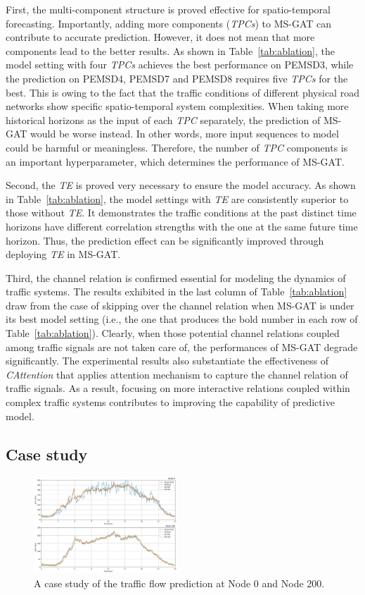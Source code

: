 First, the multi-component structure is proved effective for spatio-temporal forecasting. Importantly, adding more components (\textit{TPCs})  to MS-GAT can contribute to accurate prediction. However, it does not mean that more components lead to the better results. As shown in Table~\ref{tab:ablation}, the model setting with four \textit{TPCs} achieves the best performance on PEMSD3, while the prediction on PEMSD4, PEMSD7 and PEMSD8 requires five \textit{TPCs} for the best. This is owing to the fact that the traffic conditions of different physical road networks show specific spatio-temporal system complexities. When taking more historical horizons as the input of each \textit{TPC} separately, the prediction of MS-GAT would be worse instead. In other words, more input sequences to model could be harmful or meaningless. Therefore, the number of \textit{TPC} components is an important hyperparameter, which determines the performance of MS-GAT.

Second, the \textit{TE} is proved very necessary to ensure the model accuracy. As shown in Table~\ref{tab:ablation}, the model settings with \textit{TE} are consistently superior to those without \textit{TE}. It demonstrates the traffic conditions at the past distinct time horizons have different correlation strengths with the one at the same future time horizon. Thus, the prediction effect can be significantly improved through deploying \textit{TE} in MS-GAT.

Third, the channel relation is confirmed essential for modeling the dynamics of traffic systems. The results exhibited in the last column of Table~\ref{tab:ablation} draw from the case of skipping over the channel relation when MS-GAT is under its best model setting (i.e., the one that produces the bold number in each row of Table~\ref{tab:ablation}). Clearly, when those potential channel relations coupled among traffic signals are not taken care of, the performances of MS-GAT degrade significantly. The experimental results also substantiate the effectiveness of \textit{CAttention} that applies attention mechanism to capture the channel relation of traffic signals. As a result, focusing on more interactive relations coupled within complex traffic systems contributes to improving the capability of predictive model.

\subsection{Case study}

\begin{figure}[!ht]
    \centering
    \includegraphics[width=0.48\textwidth]{pictures/Case_1.png}
    \caption{A case study of the traffic flow prediction at Node 0 and Node 200.}
    \label{fig:case_1}
\end{figure}

